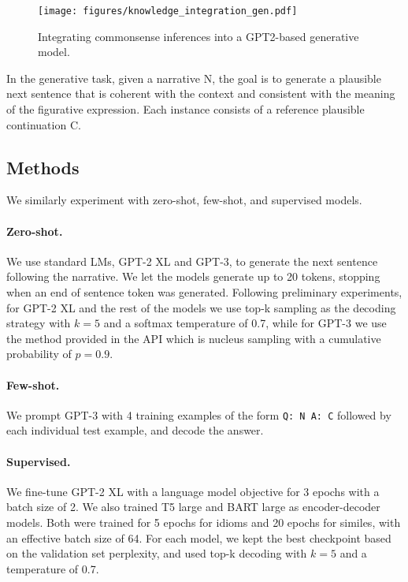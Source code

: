\begin{figure*}[t]
    \centering
    \texttt{[image: figures/knowledge\_integration\_gen.pdf]}
    \caption{Integrating commonsense inferences into a GPT2-based generative model.}
    \label{fig:architecture_generative}
\end{figure*}

In the generative task, given a narrative N, the goal is to generate a plausible next sentence that is coherent with the context and consistent with the meaning of the figurative expression. Each instance consists of a reference plausible continuation C.

\subsection{Methods}
\label{sec:generative_methods}

We similarly experiment with zero-shot, few-shot, and supervised models. 

\paragraph{Zero-shot.} We use standard LMs, GPT-2 XL and GPT-3, to generate the next sentence following the narrative. We let the models generate up to 20 tokens, stopping when an end of sentence token was generated. Following preliminary experiments, for GPT-2 XL and the rest of the models we use top-k sampling \cite{fan-etal-2018-hierarchical} as the decoding strategy with $k = 5$ and a softmax temperature of 0.7, while for GPT-3 we use the method provided in the API which is nucleus sampling \cite{holtzman2020curious} with a cumulative probability of $p = 0.9$.

\paragraph{Few-shot.} We prompt GPT-3 with 4 training examples of the form \texttt{Q: N A: C} followed by each individual test example, and decode the answer. 

\paragraph{Supervised.} We fine-tune GPT-2 XL with a language model objective for 3 epochs with a batch size of 2. We also trained T5 large \cite{raffel2020exploring} and BART large \cite{lewis-etal-2020-bart} as encoder-decoder models. Both were trained for 5 epochs for idioms and 20 epochs for similes, with an effective batch size of 64. For each model, we kept the best checkpoint based on the validation set perplexity, and used top-k decoding with $k = 5$ and a temperature of 0.7. 


